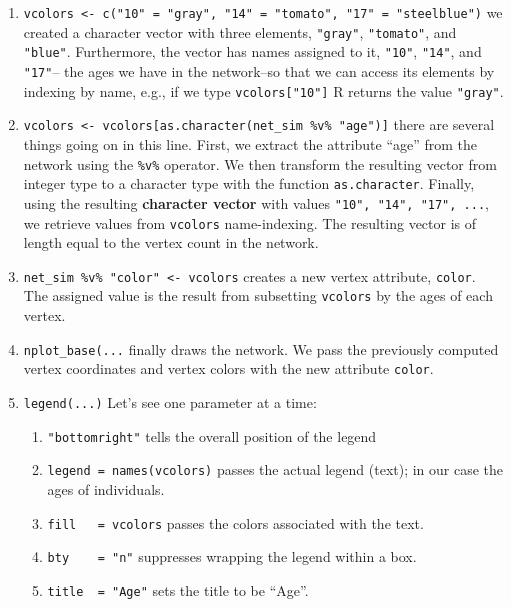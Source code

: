 \documentclass[
]{book}
\begin{document}
\begin{enumerate}
\def\labelenumi{\arabic{enumi}.}
\item
  \texttt{vcolors\ \textless{}-\ c("10"\ =\ "gray",\ "14"\ =\ "tomato",\ "17"\ =\ "steelblue")} we created
  a character vector with three elements, \texttt{"gray"}, \texttt{"tomato"}, and \texttt{"blue"}.
  Furthermore, the vector has names assigned to it, \texttt{"10"}, \texttt{"14"}, and \texttt{"17"}--
  the ages we have in the network--so that we can access its
  elements by indexing by name, e.g., if we type \texttt{vcolors{[}"10"{]}} R returns
  the value \texttt{"gray"}.
\item
  \texttt{vcolors\ \textless{}-\ vcolors{[}as.character(net\_sim\ \%v\%\ "age"){]}} there are several things
  going on in this line. First, we extract the attribute ``age'' from the network
  using the \texttt{\%v\%} operator. We then transform the resulting vector from integer type
  to a character type with the function \texttt{as.character}. Finally, using the resulting
  \textbf{character vector} with values \texttt{"10",\ "14",\ "17",\ ...}, we retrieve values
  from \texttt{vcolors} name-indexing. The resulting vector is of length equal to
  the vertex count in the network.
\item
  \texttt{net\_sim\ \%v\%\ "color"\ \textless{}-\ vcolors} creates a
  new vertex attribute, \texttt{color}. The assigned value is the result from subsetting
  \texttt{vcolors} by the ages of each vertex.
\item
  \texttt{nplot\_base(...} finally draws the network. We pass the previously computed
  vertex coordinates and vertex colors with the new attribute \texttt{color}.
\item
  \texttt{legend(...)} Let's see one parameter at a time:

  \begin{enumerate}
  \def\labelenumii{\alph{enumii}.}
  \item
    \texttt{"bottomright"} tells the overall position of the legend
  \item
    \texttt{legend\ =\ names(vcolors)} passes the actual legend (text); in our case
    the ages of individuals.
  \item
    \texttt{fill\ \ \ =\ vcolors} passes the colors associated with the text.
  \item
    \texttt{bty\ \ \ \ =\ "n"} suppresses wrapping the legend within a box.
  \item
    \texttt{title\ \ =\ "Age"} sets the title to be ``Age''.
  \end{enumerate}
\end{enumerate}
\end{document}
